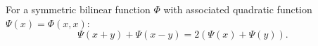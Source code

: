 For a symmetric bilinear function $\Phi$ with associated quadratic function $\Psi(x) = \Phi(x, x)$:
$$\Psi(x + y) + \Psi(x - y) = 2(\Psi(x) + \Psi(y)).$$
